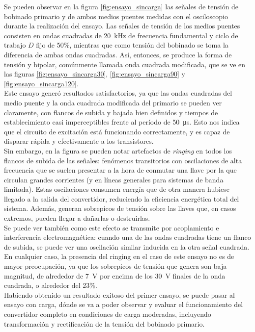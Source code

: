 Se pueden observar en la figura \ref{fig:ensayo_sincarga} las señales de tensión de bobinado primario y de ambos medios puentes medidas con el osciloscopio durante la realización del ensayo. Las señales de tensión de los medios puentes consisten en ondas cuadradas de \SI[]{20}{\kilo\hertz} de frecuencia fundamental y ciclo de trabajo $D$ fijo de 50\%, mientras que como tensión del bobinado se toma la diferencia de ambas ondas cuadradas. Así, entonces, se produce la forma de tensión  y bipolar, comúnmente llamada onda cuadrada modificada, que se ve en las figuras \ref{fig:ensayo_sincarga30}, \ref{fig:ensayo_sincarga90} y \ref{fig:ensayo_sincarga120}.\\

Este ensayo generó resultados satisfactorios, ya que las ondas cuadradas del medio puente y la onda cuadrada modificada del primario se pueden ver claramente, con flancos de subida y bajada bien definidos y tiempos de establecimiento casi imperceptibles frente al período de \SI[]{50}{\micro\second}. Esto nos indica que el circuito de excitación está funcionando correctamente, y es capaz de disparar rápida y efectivamente a los transistores.\\

Sin embargo, en la figura se pueden notar artefactos de \textit{ringing} en todos los flancos de subida de las señales: fenómenos transitorios con oscilaciones de alta frecuencia que se suelen presentar a la hora de conmutar una llave por la que circulan grandes corrientes (y en líneas generales para sistemas de banda limitada). Estas oscilaciones consumen energía que de otra manera hubiese llegado a la salida del convertidor, reduciendo la eficiencia energética total del sistema. Además, generan sobrepicos de tensión sobre las llaves que, en casos extremos, pueden llegar a dañarlas o destruirlas.\\

Se puede ver también como este efecto se transmite por acoplamiento e interferencia electromagnética: cuando una de las ondas cuadradas tiene un flanco de subida, se puede ver una oscilación similar inducida en la otra señal cuadrada. En cualquier caso, la presencia del ringing en el caso de este ensayo no es de mayor preocupación, ya que los sobrepicos de tensión que genera son baja magnitud, de alrededor de \SI[]{7}{\volt} por encima de los \SI{30}{\volt} finales de la onda cuadrada, o alrededor del 23\%.\\

Habiendo obtenido un resultado exitoso del primer ensayo, se puede pasar al ensayo con carga, dónde se va a poder observar y evaluar el funcionamiento del convertidor completo en condiciones de carga moderadas, incluyendo transformación y rectificación de la tensión del bobinado primario.\\